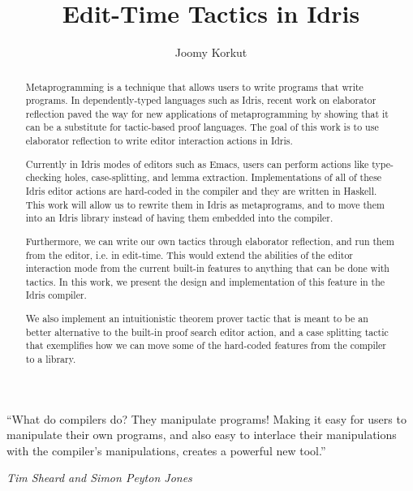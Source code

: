 \documentclass[11pt, ma]{westhesis}
\title{Edit-Time Tactics in Idris}
\author{Joomy Korkut}
\theoremstyle{plain}
\theoremstyle{definition}
\numberwithin{section}{chapter}
\numberwithin{figure}{chapter}
\begin{document}
\begin{abstract}
  Metaprogramming is a technique that allows users to write programs that
  write programs. In dependently-typed languages such as Idris, recent work on
  elaborator reflection paved the way for new applications of metaprogramming
  by showing that it can be a substitute for tactic-based proof languages.
  The goal of this work is to use elaborator reflection to write editor
  interaction actions in Idris.

  Currently in Idris modes of editors such as Emacs, users can perform actions
  like type-checking holes, case-splitting, and lemma extraction.
  Implementations of all of these Idris editor actions are hard-coded in the
  compiler and they are written in Haskell. This work will allow us to rewrite
  them in Idris as metaprograms, and to move them into an Idris library instead
  of having them embedded into the compiler.

  Furthermore, we can write our own tactics through elaborator
  reflection, and run them from the editor, i.e. in edit-time.
  This would extend the abilities of the editor interaction mode from the
  current built-in features to anything that can be done with tactics.
  In this work, we present the design and implementation of this feature in the
  Idris compiler.

  We also implement an intuitionistic theorem prover tactic that is meant to be an
  better alternative to the built-in proof search editor action, and a case
  splitting tactic that exemplifies how we can move some of the hard-coded
  features from the compiler to a library.
\end{abstract}

\begin{dedication}
  \epigraph{``What do compilers do? They manipulate programs! Making it easy
  for users to manipulate their own programs, and also easy to interlace their
  manipulations with the compiler’s manipulations, creates a powerful new
  tool.''}{\textit{Tim Sheard and Simon Peyton Jones}\cite{th}}
\end{dedication}
\end{document}
